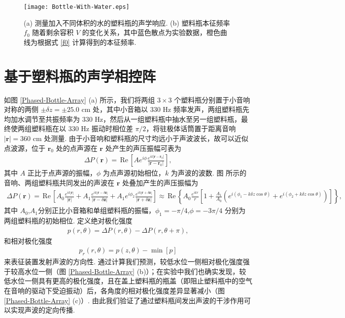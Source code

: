 \documentclass[a4paper, 10pt]{article}
\providecommand{\abs}[1]{\left\lvert#1\right\rvert} %
\providecommand{\re}{\,\mathrm{Re}\,} %
\begin{document}
\begin{figure}[h]
    \centering
    \texttt{[image: Bottle-With-Water.eps]}
    \caption{(a) 测量加入不同体积的水的塑料瓶的声学响应. (b) 塑料瓶本征频率 $f_0$ 随着剩余容积 $V$ 的变化关系，其中蓝色散点为实验数据，橙色曲线为根据式 \eqref{f0} 计算得到的本征频率.}
    \label{Bottle-With-Water}
\end{figure}

\section{基于塑料瓶的声学相控阵}
如图 \ref{Phased-Bottle-Array} (a) 所示，我们将两组 $3\times 3$ 个塑料瓶分别置于小音响对称的两侧 $\pm\delta z=\pm 25.0$ cm 处，其中小音箱以 $330$ Hz 频率发声，两组塑料瓶先均加水调节至共振频率为 $330$ Hz，然后从一组塑料瓶中抽水至另一组塑料瓶，最终使两组塑料瓶在以 $330$ Hz 振动时相位差 $\pi/2$，将驻极体话筒置于距离音响 $\abs{\bm{r}}=360$ cm 处测量. 由于小音响和塑料瓶的尺寸均远小于声波波长，故可以近似点波源，位于 $\bm{r}_0$ 处的点声源在 $\bm{r}$ 处产生的声压振幅可表为
\begin{align}
    \Delta P(\bm{r})=\re\left[Ae^{i\phi}\frac{e^{ik\abs{\bm{r}-\bm{r}_0}}}{\abs{\bm{r}-\bm{r}_0}}\right],
\end{align}
其中 $A$ 正比于点声源的振幅，$\phi$ 为点声源初始相位，$k$ 为声波的波数. 图  所示的音响、两组塑料瓶共同发出的声波在 $\bm{r}$ 处叠加产生的声压振幅为
\begin{align}
    \Delta P(\bm{r})=\re\left[A_0\frac{e^{ik\abs{\bm{r}}}}{\abs{\bm{r}}}+A_1\frac{e^{ik\abs{\bm{r}-\delta\bm{z}}}}{\abs{\bm{r}-\delta\bm{z}}}+A_1e^{i\phi_2}\frac{e^{ik\abs{\bm{r}+\delta\bm{z}}}}{\abs{\bm{r}+\delta\bm{z}}}\right]\approx\re\left\{A_0\frac{e^{ikr}}{r}\left[1+\frac{A_1}{A_0}\left(e^{i(\phi_1-k\delta z\cos\theta)}+e^{i(\phi_2+k\delta z\cos\theta)}\right)\right]\right\},
\end{align}
其中 $A_0$,$A_1$分别正比小音箱和单组塑料瓶的振幅，$\phi_1=-\pi/4$,$\phi=-3\pi/4$ 分别为两组塑料瓶的初始相位. 定义绝对极化强度
\begin{align}
    p(r,\theta)=\Delta P(r,\theta)-\Delta P(r,\theta+\pi),
\end{align}
和相对极化强度
\begin{align}
    p_r(r,\theta)=p(z,\theta)-\min[p]
\end{align}
来表征装置发射声波的方向性. 通过计算我们预测，较低水位一侧相对极化强度强于较高水位一侧（图 \ref{Phased-Bottle-Array} (b)）；在实验中我们也确实发现，较低水位一侧具有更高的极化强度，且在盖上塑料瓶的瓶盖（即阻止塑料瓶中的空气在音响的驱动下受迫振动）后，各角度的相对极化强度差异显著减小（图 \ref{Phased-Bottle-Array} (c)）. 由此我们验证了通过塑料瓶间发出声波的干涉作用可以实现声波的定向传播.
\end{document}

